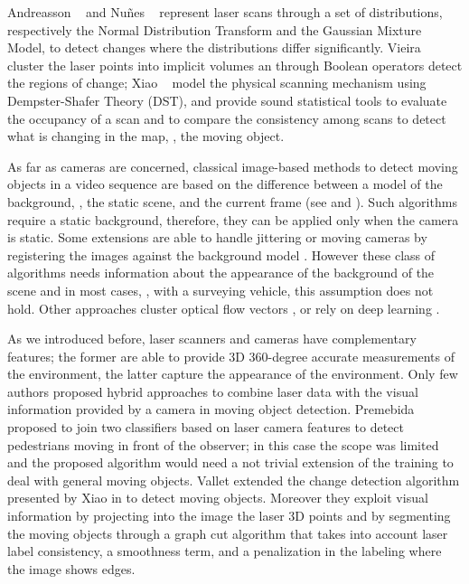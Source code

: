 Andreasson \etal~\cite{andreasson2007has} and Nu{\~n}es \etal~\cite{nunez2010change} represent laser scans through a set of distributions, respectively the Normal Distribution Transform and the Gaussian Mixture Model, to detect changes where the distributions differ significantly. 
Vieira \etal~\cite{vieira2014spatial} cluster the laser points into implicit volumes an through Boolean operators detect the regions of change;
Xiao \etal~\cite{xiao2013change} model the physical scanning mechanism using Dempster-Shafer Theory (DST), and provide sound statistical tools to evaluate the occupancy of a scan and to compare the consistency among scans to detect what is changing in the map, \ie, the moving object. %

As far as cameras are concerned, classical image-based methods to detect moving objects in a video sequence are based on the difference between a model of the background, \ie, the static scene, and the current frame (see \cite{Piccardi2004background} and \cite{Sobral2014}). 
Such algorithms require a static background, therefore, they can be applied only when the camera is static. 
Some extensions are able to handle jittering or moving cameras by registering the images against the background model \cite{azzari2005effective,romanoni2014background,kim2013detection,shakeri2014detection}.
However these class of algorithms needs information about the appearance of the background of the scene and in most cases, \eg, with a surveying vehicle, this assumption does not hold. 
Other approaches cluster optical flow vectors \cite{markovic2014moving}, or rely on deep learning \cite{lin2014deep}.

As we introduced before, laser scanners and cameras have complementary features; the former are able to provide 3D 360-degree accurate measurements of the environment, the latter capture the appearance of the environment. Only few authors proposed hybrid approaches to combine laser data with the visual information provided by a camera in moving object detection.
Premebida \etal \cite{premebida2009lidar} proposed to join two classifiers based on laser camera features to detect pedestrians moving in front of the observer; in this case the scope was limited and the proposed algorithm would need a not trivial extension of the training to deal with general moving objects.
Vallet \etal \cite{vallet2015extracting} extended the change detection algorithm presented by Xiao \etal in \cite{xiao2013change} to detect moving objects. Moreover they exploit visual information by projecting into the image the laser 3D points and by segmenting the moving objects through a graph cut algorithm that takes into account laser label consistency, a smoothness term, and a penalization in the labeling where the image shows edges. 

